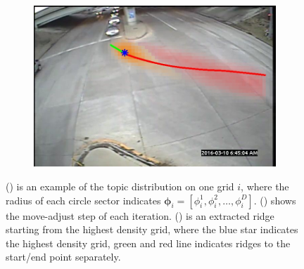 \begin{figure}
\begin{subfigure}{0.35\linewidth}
        \subcaption{}
        \label{subfig:scene-step}
    \end{subfigure}
    \begin{subfigure}{0.35\linewidth}
        \includegraphics[width=\linewidth]{./img/scene_learning/single_ridge-1.jpg}
        \subcaption{}
        \label{subfig:scene-single-ridge}
    \end{subfigure}%
    \caption{() is an example of the topic distribution on one grid $i$, where the radius of each circle sector indicates $\bm{\phi}_i= [\phi_i^{1}, \phi_i^{2}, \dots, \phi_i^{D}]$. () shows the move-adjust step of each iteration. () is an extracted ridge starting from the highest density grid, where the blue star indicates the highest density grid, green and red line indicates ridges to the start/end point separately.}
    \label{fig:scene-step}
\end{figure}